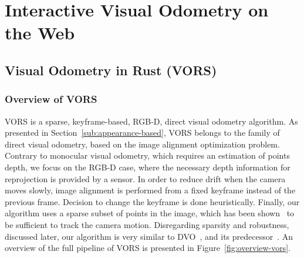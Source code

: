 \chapter{Interactive Visual Odometry on the Web}%
\label{cha:interactive_vo_on_the_web}

\minitoc%
\clearpage

\section{Visual Odometry in Rust (VORS)}%
\label{sec:vors}

\subsection{Overview of VORS}%
\label{sub:vors-overview}

VORS is a sparse, keyframe-based, RGB-D, direct visual odometry algorithm.
As presented in Section~\ref{sub:appearance-based},
VORS belongs to the family of direct visual odometry,
based on the image alignment optimization problem.
Contrary to monocular visual odometry, which requires an estimation
of points depth, we focus on the RGB-D case,
where the necessary depth information for reprojection is provided by a sensor.
In order to reduce drift when the camera moves slowly,
image alignment is performed from a fixed keyframe instead of the previous frame.
Decision to change the keyframe is done heuristically.
Finally, our algorithm uses a sparse subset of points in the image,
which has been shown~\cite{engel2017direct} to be sufficient to track the camera motion.
Disregarding sparsity and robustness, discussed later,
our algorithm is very similar to DVO~\cite{kerl2013robust},
and its predecessor~\cite{steinbrucker2011real}.
An overview of the full pipeline of VORS is presented in Figure~\ref{fig:overview-vors}.

